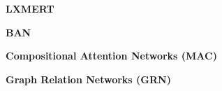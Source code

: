 \textbf{LXMERT \cite{tan2019lxmert}}


\textbf{BAN \cite{kim2018bilinear}}

\textbf{Compositional Attention Networks (MAC) \cite{hudson2018compositional}}

\textbf{Graph Relation Networks (GRN) \cite{guo2019bilinear}}

